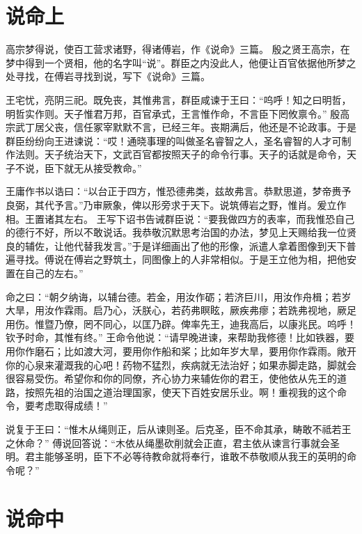 \documentclass[12pt,UTF8]{ctexbook}
\begin{document}
\chapter{说命上}

高宗梦得说，使百工营求诸野，得诸傅岩，作《说命》三篇。
殷之贤王高宗，在梦中得到一个贤相，他的名字叫“说”。群臣之内没此人，他便让百官依据他所梦之处寻找，在傅岩寻找到说，写下《说命》三篇。

王宅忧，亮阴三祀。既免丧，其惟弗言，群臣咸谏于王曰：“呜呼！知之曰明哲，明哲实作则。天子惟君万邦，百官承式，王言惟作命，不言臣下罔攸禀令。”
殷高宗武丁居父丧，信任冢宰默默不言，已经三年。丧期满后，他还是不论政事。于是群臣纷纷向王进谏说：“哎！通晓事理的叫做圣名睿智之人，圣名睿智的人才可制作法则。天子统治天下，文武百官都按照天子的命令行事。天子的话就是命令，天子不说，臣下就无从接受教命。”

王庸作书以诰曰：“以台正于四方，惟恐德弗类，兹故弗言。恭默思道，梦帝赉予良弼，其代予言。”乃审厥象，俾以形旁求于天下。说筑傅岩之野，惟肖。爰立作相。王置诸其左右。
王写下诏书告诫群臣说：“要我做四方的表率，而我惟恐自己的德行不好，所以不敢说话。我恭敬沉默思考治国的办法，梦见上天赐给我一位贤良的辅佐，让他代替我发言。”于是详细画出了他的形像，派遣人拿着图像到天下普遍寻找。傅说在傅岩之野筑土，同图像上的人非常相似。于是王立他为相，把他安置在自己的左右。”

命之曰：“朝夕纳诲，以辅台德。若金，用汝作砺；若济巨川，用汝作舟楫；若岁大旱，用汝作霖雨。启乃心，沃朕心，若药弗瞑眩，厥疾弗瘳；若跣弗视地，厥足用伤。惟暨乃僚，罔不同心，以匡乃辟。俾率先王，迪我高后，以康兆民。呜呼！钦予时命，其惟有终。”
王命令他说：“请早晚进谏，来帮助我修德！比如铁器，要用你作磨石；比如渡大河，要用你作船和桨；比如年岁大旱，要用你作霖雨。敞开你的心泉来灌溉我的心吧！药物不猛烈，疾病就无法治好；如果赤脚走路，脚就会很容易受伤。希望你和你的同僚，齐心协力来辅佐你的君王，使他依从先王的道路，按照先祖的治国之道治理国家，使天下百姓安居乐业。啊！重视我的这个命令，要考虑取得成绩！”

说复于王曰：“惟木从绳则正，后从谏则圣。后克圣，臣不命其承，畴敢不祗若王之休命？”
傅说回答说：“木依从绳墨砍削就会正直，君主依从谏言行事就会圣明。君主能够圣明，臣下不必等待教命就将奉行，谁敢不恭敬顺从我王的英明的命令呢？”

\chapter{说命中}
\end{document}
